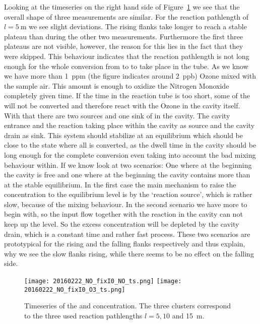 Looking at the  timeseries on the right hand side of
Figure~\ref{fig:ts} we see that the overall shape of three
measurements are similar. For the reaction pathlength of $l=
\SI{5}{\meter}$ we see slight deviations. The rising flanks take
longer to reach a stable plateau than during the other two
measurements. Furthermore the first three plateaus are not visible,
however, the reason for this lies in the fact that they were
skipped. This behaviour indicates that the reaction
pathlength is not long enough for the whole conversion from  to
 to take place in the tube. As we know we have more than
\SI{1}{ppm} (the figure indicates around \SI{2}{ppb}) Ozone mixed with
the sample air. This amount is enough to oxidize the Nitrogen Monoxide
completely given time. If the time in the reaction tube is too short,
some of the  will not be converted and therefore react with the
Ozone in the cavity itself. With that there are two sources and one
sink of  in the cavity. The cavity entrance and the reaction
taking place within the cavity as source and the cavity drain as
sink. This system should stabilize at an equilibrium which should be
close to the state where all  is converted, as the dwell time
in the cavity should be long enough for the complete conversion even
taking into account the bad mixing behaviour within. If we know look
at two scenarios: One where at the beginning the cavity is 
free and one where at the beginning the cavity contains more 
than at the stable equilibrium. In the first case the main mechanism
to raise the  concentration to the equilibrium level is by the
`reaction source', which is rather slow, because of the mixing
behaviour. In the second scenario we have more  to begin with,
so the input flow together with the reaction in the cavity can not
keep up the level. So the excess concentration will be depleted by the
cavity drain, which is a constant time and rather fast process. These
two scenarios are prototypical for the rising and the falling flanks
respectively and thus explain, why we see the slow flanks rising,
while there seems to be no effect on the falling side.

\begin{figure}[htbp]
  \centering
  \texttt{[image: 20160222\_NO\_fixI0\_NO\_ts.png]}
  \hfill
  \texttt{[image: 20160222\_NO\_fixI0\_O3\_ts.png]}
  \caption{Timeseries of the  and  concentration. The
    three clusters correspond to the three used reaction pathlengths
    $l = 5, 10$ and \SI{15}{\meter}.}
  \label{fig:ts}
\end{figure}

